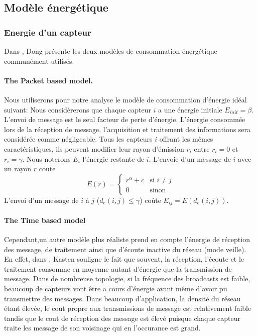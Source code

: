 \subsection{Modèle énergétique}
\subsubsection{Energie d'un capteur}
Dans \cite{Dong2005}, Dong présente les deux modèles de consommation énergétique communément utilisés.
\paragraph{The Packet based model.}
Nous utiliserons pour notre analyse le modèle de consommation d'énergie idéal suivant:
Nous considèrerons que chaque capteur $i$ a une énergie initiale $E_{init}=\beta$.
L'envoi de message est le seul facteur de perte d'énergie. L'énergie consommée lors de la réception de message, l'acquisition et traitement des informations sera considérée comme négligeable.
Tous les capteurs $i$ offrant les mêmes caractéristiques, ils peuvent modifier leur rayon d'émission $r_i$ entre $r_i=0$ et $r_i=\gamma$.
Nous noterons $E_i$ l'énergie restante de $i$.
L'envoie d'un message de $i$ avec un rayon $r$ coute $$ E(r)= \begin{cases} r^\alpha + c & \text{si }i\neq j \\ 0 & \text{sinon}  \end{cases}$$
L'envoi d'un message de $i$ à $j$ ($d_e(i,j)\leq \gamma$) coûte  $ E_{ij}=E(d_e(i,j))$.

\paragraph{The Time based model}
Cependant,un autre modèle plus réaliste prend en compte l'énergie de réception des message, de traitement ainsi que d'écoute inactive du réseau (mode veille).
En effet, dans \cite{Kasten2001}, Kasten souligne le fait que souvent, la réception, l'écoute et le traitement consomme en moyenne autant d'énergie que la transmission de message.
Dans de nombreuse topologie, si la fréquence des broadcasts est faible, beaucoup de capteurs vont être a cours d'énergie avant même d'avoir pu transmettre des messages.
Dans beaucoup d'application, la densité du réseau étant élevée, le cout propre aux transmissions de message est relativement faible tandis que le cout de réception des message est élevé puisque chaque capteur traite les message de son voisinage
qui en l'occurance est grand.



